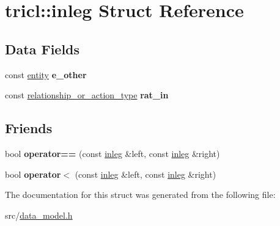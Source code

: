 \hypertarget{structtricl_1_1inleg}{}\section{tricl\+:\+:inleg Struct Reference}
\label{structtricl_1_1inleg}
\subsection*{Data Fields}
\begin{DoxyCompactItemize}
\item 
\mbox{\label{structtricl_1_1inleg_aacd096c1b1998b321f19b973db55aec2}} 
const \hyperlink{data__model_8h_a57273122278e8b301844e2a2e1f0742f}{entity} {\bfseries e\+\_\+other}
\item 
\mbox{\label{structtricl_1_1inleg_aa0bf7ed4910869446d610bf75d05fc34}} 
const \hyperlink{data__model_8h_a2d01894944fb58a8fedc0912a48d13f8}{relationship\+\_\+or\+\_\+action\+\_\+type} {\bfseries rat\+\_\+in}
\end{DoxyCompactItemize}
\subsection*{Friends}
\begin{DoxyCompactItemize}
\item 
\mbox{\label{structtricl_1_1inleg_a2882c00597e94a9fb19cde857cfe5003}} 
bool {\bfseries operator==} (const \hyperlink{structtricl_1_1inleg}{inleg} \&left, const \hyperlink{structtricl_1_1inleg}{inleg} \&right)
\item 
\mbox{\label{structtricl_1_1inleg_a8ddd31813cdcbb1b7c88d51fcd01cd23}} 
bool {\bfseries operator$<$} (const \hyperlink{structtricl_1_1inleg}{inleg} \&left, const \hyperlink{structtricl_1_1inleg}{inleg} \&right)
\end{DoxyCompactItemize}


The documentation for this struct was generated from the following file\+:\begin{DoxyCompactItemize}
\item 
src/\hyperlink{data__model_8h}{data\+\_\+model.\+h}\end{DoxyCompactItemize}
